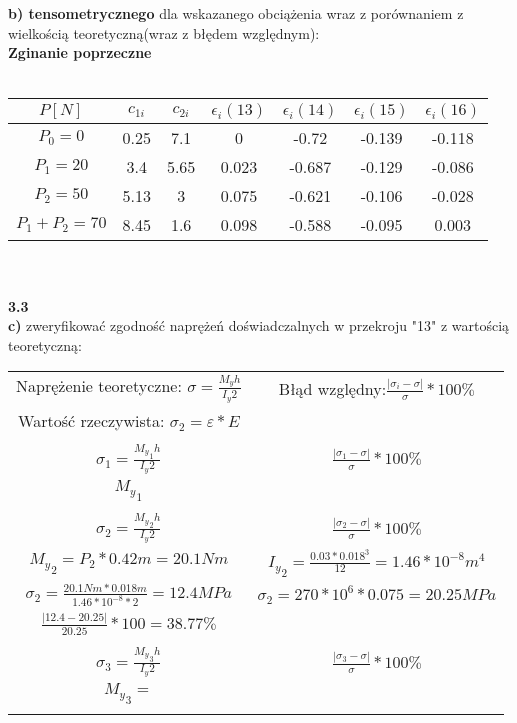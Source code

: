 \documentclass[11pt]{article}
\begin{document}
\textbf{b) tensometrycznego} dla wskazanego obciążenia wraz z porównaniem z wielkością teoretyczną(wraz z błędem względnym):\\







\textbf{Zginanie poprzeczne}\\\\
\begin{tabular}{|c|c|c|c|c|c|c|}\hline
$P[N]$ & $c_{1i}$ & $c_{2i}$ & $\epsilon_i(13)$ & $\epsilon_i(14)$ & $\epsilon_i(15)$ & $\epsilon_i(16)$\\ \hline
$P_0 = 0$ & 0.25 & 7.1 & 0 & -0.72 & -0.139 & -0.118\\ \hline
$P_1 = 20$ & 3.4 & 5.65 & 0.023 & -0.687 & -0.129 & -0.086\\ \hline
$P_2 = 50$ & 5.13 & 3 & 0.075 & -0.621 & -0.106 & -0.028\\ \hline
$P_1 + P_2 = 70$ & 8.45 & 1.6 & 0.098 & -0.588 & -0.095 & 0.003\\ \hline
\end{tabular}\\\\

\textbf{3.3}\\
\textbf{c)} zweryfikować zgodność naprężeń doświadczalnych w przekroju "13" z wartością teoretyczną:\\
\begin{tabular}{cc}
Naprężenie teoretyczne: $\sigma = \frac{M_yh}{I_y2}$ & Błąd względny:$\frac{|\sigma_i - \sigma|}{\sigma} * 100\%$\\
Wartość rzeczywista: $\sigma_2=\varepsilon*E$\\\\

$\sigma_1 = \frac{{M_y}_1h}{I_y2}$  &	$\frac{|\sigma_1 - \sigma|}{\sigma} * 100\%$\\
${M_y}_1$\\\\
$\sigma_2 = \frac{{M_y}_2h}{I_y2}$  &	$\frac{|\sigma_2 - \sigma|}{\sigma} * 100\%$\\
${M_y}_2=P_2*0.42m=20.1Nm$ & ${I_y}_2=\frac{0.03*0.018^3}{12}=1.46*10^{-8}m^4$\\
$\sigma_2 = \frac{20.1Nm*0.018m}{1.46*10^{-8}*2}=12.4MPa$ & $\sigma_2=270*10^6*0.075=20.25MPa$\\
$\frac{|12.4- 20.25|}{20.25} * 100=38.77\%$\\\\
$\sigma_3 = \frac{{M_y}_3h}{I_y2}$  &	$\frac{|\sigma_3 - \sigma|}{\sigma} * 100\%$\\
${M_y}_3=$\\\\

\end{tabular}\\\\
\end{document}
